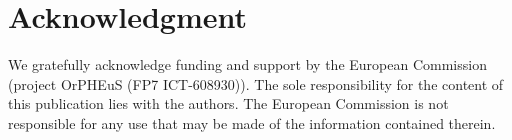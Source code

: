 \documentclass[a4paper,twoside]{article}
\begin{document}
\section*{Acknowledgment}
\noindent
We gratefully acknowledge funding and support by the European
Commission (project OrPHEuS (FP7 ICT-608930)). The sole
responsibility for the content of this publication lies with the
authors. 
The European Commission is not responsible for any use that
may be made of the information contained therein.





\end{document}
